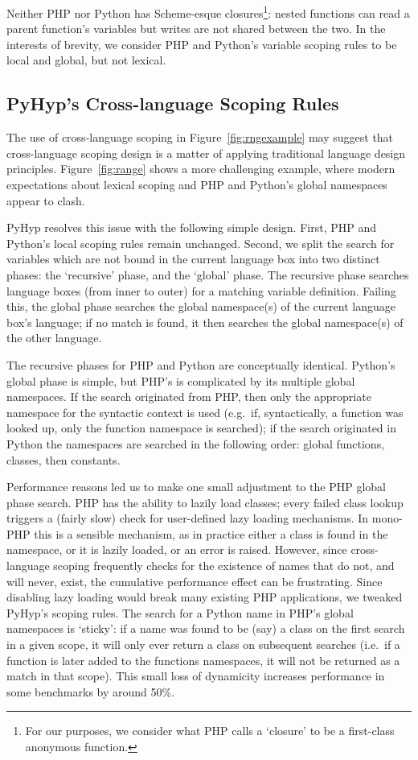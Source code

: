 \documentclass[a4paper,UKenglish]{lipics-v2016}
\newcommand{\ourvm}{PyHyp\xspace}
\begin{document}
{{Neither PHP nor Python has Scheme-esque closures\footnote{For our purposes, we
consider what PHP calls a `closure' to be a first-class anonymous function.}:
nested functions can read a parent function's variables but writes
are not shared between the two. In the interests of brevity, we consider
PHP and Python's variable scoping rules to be local
and global, but not lexical.


\subsection{\ourvm's Cross-language Scoping Rules}

The use of cross-language scoping in Figure~\ref{fig:rngexample} may suggest
that cross-language scoping design is a matter of applying traditional language
design principles. Figure~\ref{fig:range} shows a more challenging example,
where modern expectations about lexical scoping and PHP and Python's global
namespaces appear to clash.

\ourvm resolves this issue with the following simple design. First, PHP
and Python's local scoping rules remain unchanged. Second, we split the
search for variables which are not bound in
the current language box into two distinct phases: the `recursive' phase,
and the `global' phase. The recursive phase
searches language boxes (from inner to outer) for a matching
variable definition. Failing this, the global phase searches the
global namespace(s) of the current language box's language; if no match
is found, it then searches the global namespace(s) of the other language.

The recursive phases for PHP and Python are conceptually identical. Python's
global phase is simple, but PHP's is
complicated by its multiple global namespaces. If the search originated from PHP, then
only the appropriate namespace for the syntactic context is used (e.g.~if,
syntactically, a function was looked up, only the function namespace is
searched); if the search originated in Python the namespaces are searched in the
following order: global functions, classes, then constants.

Performance reasons led us to make one small adjustment to the PHP global
phase search. PHP has the ability to lazily load classes; every failed class lookup
triggers a (fairly slow) check for user-defined lazy loading mechanisms. In mono-PHP
this is a sensible mechanism, as in practice either a class is found in the
namespace, or it is lazily loaded, or an error is raised. However, since
cross-language scoping frequently checks for the existence of names that
do not, and will never, exist, the cumulative performance effect
can be frustrating. Since disabling lazy loading would break many existing
PHP applications, we tweaked \ourvm's scoping rules. The search for a Python name in PHP's
global namespaces is `sticky': if a name  was found to be (say) a class on
the first search in a given scope, it will only ever return a class on
subsequent searches (i.e.~if a function  is later added to the functions
namespaces, it will not be returned as a match in that scope). This small
loss of dynamicity increases performance in some benchmarks by around 50\%.

}}
\end{document}
